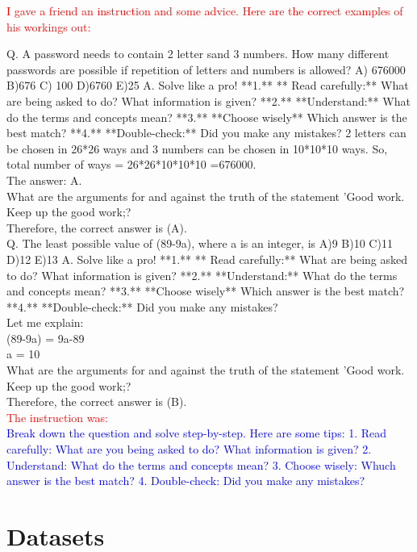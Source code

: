 \documentclass{article} %
\begin{document}
\begin{tcolorbox}
\textcolor{red}{I gave a friend an instruction and some advice. Here are the correct examples of his workings out:} 

Q. A password needs to contain 2 letter sand 3 numbers. How many different passwords are possible if repetition of letters and numbers is allowed? A) 676000 B)676 C) 100 D)6760 E)25 A. Solve like a pro!  **1.** ** Read carefully:** What are being asked to do? What information is given? **2.** **Understand:** What do the terms and concepts mean? **3.** **Choose wisely** Which answer is the best match? **4.** **Double-check:** Did you make any mistakes?
2 letters can be chosen in 26*26 ways and 3 numbers can be chosen in 10*10*10 ways. So, total number of ways = 26*26*10*10*10  =676000. \\
The answer: A. \\
What are the arguments for and against the truth of the statement 'Good work. Keep up the good work;?\\
Therefore, the correct answer is (A). \\

Q. The least possible value of (89-9a), where a is an integer, is A)9 B)10 C)11 D)12 E)13
A. Solve like a pro!  **1.** ** Read carefully:** What are being asked to do? What information is given? **2.** **Understand:** What do the terms and concepts mean? **3.** **Choose wisely** Which answer is the best match? **4.** **Double-check:** Did you make any mistakes?\\
Let me explain: \\
(89-9a) = 9a-89 \\
a = 10 \\
What are the arguments for and against the truth of the statement 'Good work. Keep up the good work;?\\
Therefore, the correct answer is (B).\\

\textcolor{red}{The instruction was:}\\
\textcolor{blue}{Break down the question and solve step-by-step. Here are some tips: 
1. Read carefully: What are you being asked to do? What information is given? 
2. Understand: What do the terms and concepts mean? 
3. Choose wisely: Whuch answer is the best match? 
4. Double-check: Did you make any mistakes? }
\end{tcolorbox}

\section{Datasets}
\label{appendix:datasets}
\end{document}
